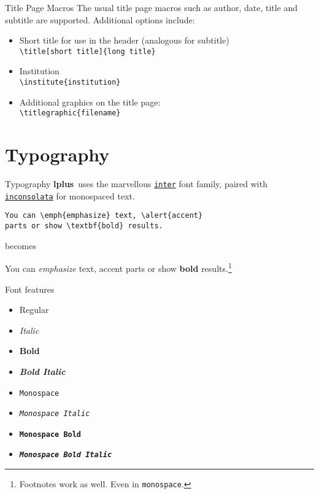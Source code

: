 \documentclass[aspectratio=169,colorblocks,darkmode]{beamer}
\newcommand{\themename}{\textbf{lplus}~}
\begin{document}
\begin{frame}[fragile]{Title Page Macros}
The usual title page macros such as author, date, title and subtitle are supported.
Additional options include:
\begin{itemize}
\item Short title for use in the header (analogous for subtitle) \\
\verb+\title[short title]{long title}+ 
\item Institution \\ 
\verb+\institute{institution}+
\item Additional graphics on the title page: \\ 
\verb+\titlegraphic{filename}+
\end{itemize}
\end{frame}

\section{Typography}

\begin{frame}[fragile]{Typography}
\themename uses the marvellous \href{https://rsms.me/inter/}{\texttt{inter}} font family, paired with \href{https://levien.com/type/myfonts/inconsolata.html}{\texttt{inconsolata}} for monospaced text.
\begin{verbatim}
You can \emph{emphasize} text, \alert{accent} 
parts or show \textbf{bold} results.
\end{verbatim}
\begin{center}becomes\end{center}
You can \emph{emphasize} text, \alert{accent} parts or show \textbf{bold} results.\footnote{Footnotes work as well. Even in \texttt{monospace}.}
\end{frame}

\begin{frame}{Font features}
  \begin{itemize}
    \item Regular
    \item \textit{Italic}
    \item \textbf{Bold}
    \item \textbf{\textit{Bold Italic}}
    \item \texttt{Monospace}
    \item \texttt{\textit{Monospace Italic}}
    \item \texttt{\textbf{Monospace Bold}}
    \item \texttt{\textbf{\textit{Monospace Bold Italic}}}
  \end{itemize}
\end{frame}
\end{document}
